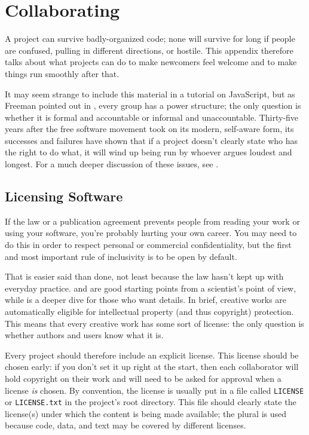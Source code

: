 \chapter{Collaborating}\label{s:collab}

A project can survive badly-organized code;
none will survive for long if people are confused,
pulling in different directions,
or hostile.
This appendix therefore talks about what projects can do to make newcomers feel welcome
and to make things run smoothly after that.

It may seem strange to include this material in a tutorial on JavaScript,
but as Freeman pointed out in \cite{Free1972},
every group has a power structure;
the only question is whether it is formal and accountable
or informal and unaccountable.
Thirty-five years after the free software movement took on its modern, self-aware form,
its successes and failures have shown that if a project doesn't clearly state
who has the right to do what,
it will wind up being run by whoever argues loudest and longest.
For a much deeper discussion of these issues,
see \cite{Foge2005}.

\section{Licensing Software}\label{s:collab-software}

If the law or a publication agreement prevents people from reading your work or using your software,
you're probably hurting your own career.
You may need to do this in order to respect personal or commercial confidentiality,
but the first and most important rule of inclusivity
is to be open by default.

That is easier said than done,
not least because the law hasn't kept up with everyday practice.
\cite{Mori2012} and 
are good starting points from a scientist's point of view,
while \cite{Lind2008} is a deeper dive for those who want details.
In brief,
creative works are automatically eligible for intellectual property (and thus copyright) protection.
This means that every creative work has some sort of license:
the only question is whether authors and users know what it is.

Every project should therefore include an explicit license.
This license should be chosen early:
if you don't set it up right at the start,
then each collaborator will hold copyright on their work
and will need to be asked for approval when a license \emph{is} chosen.
By convention,
the license is usually put in a file called \texttt{LICENSE} or \texttt{LICENSE.txt} in the project's root directory.
This file should clearly state the license(s) under which the content is being made available;
the plural is used because code, data, and text may be covered by different licenses.

